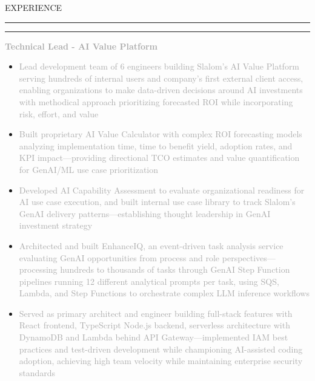 \documentclass[10pt,letterpaper]{article}
\newcommand{\mainheader}[1]{%
    \vspace{6pt}
    {\displayfont\Large\textcolor{accent}{\MakeUppercase{#1}}}
    \vspace{1pt}
    \par\noindent\textcolor{accent}{\rule{5.0in}{2pt}}
    \vspace{3pt}
}
\newcommand{\companyHeader}[2]{%
    \vspace{3pt}
    \noindent\textcolor{#2}{\rule{3pt}{10pt}}\hspace{6pt}{\headingfont\normalsize\textbf{\textcolor{darkgray}{#1}}}
    \vspace{1pt}
}
\newcommand{\positionHeader}[2]{%
    \noindent\textbf{\textcolor{darkgray}{#2}}\hspace{4pt}{\footnotesize\textcolor{mediumgray}{//}}\hspace{4pt}{\footnotesize\itshape\textcolor{mediumgray}{#1}}
    \vspace{1pt}
}
\begin{document}
\begin{minipage}[t][10.5in][t]{5.6in}
\vspace{0.3in}
\hspace{0.3in}
\begin{minipage}{5.0in}
\raggedright

\mainheader{Experience}
\vspace{-8pt}

\companyHeader{Slalom}{company1}

\positionHeader{2023 – Present}{Technical Lead - AI Value Platform}
\begin{itemize}
    \setlength\itemsep{0.25pt}
    \item\small\textcolor{darkgray}{Lead development team of 6 engineers building Slalom's AI Value Platform serving hundreds of internal users and company's first external client access, enabling organizations to make data-driven decisions around AI investments with methodical approach prioritizing forecasted ROI while incorporating risk, effort, and value}
    \item\small\textcolor{darkgray}{Built proprietary AI Value Calculator with complex ROI forecasting models analyzing implementation time, time to benefit yield, adoption rates, and KPI impact—providing directional TCO estimates and value quantification for GenAI/ML use case prioritization}
    \item\small\textcolor{darkgray}{Developed AI Capability Assessment to evaluate organizational readiness for AI use case execution, and built internal use case library to track Slalom's GenAI delivery patterns—establishing thought leadership in GenAI investment strategy}
    \item\small\textcolor{darkgray}{Architected and built EnhanceIQ, an event-driven task analysis service evaluating GenAI opportunities from process and role perspectives—processing hundreds to thousands of tasks through GenAI Step Function pipelines running 12 different analytical prompts per task, using SQS, Lambda, and Step Functions to orchestrate complex LLM inference workflows}
    \item\small\textcolor{darkgray}{Served as primary architect and engineer building full-stack features with React frontend, TypeScript Node.js backend, serverless architecture with DynamoDB and Lambda behind API Gateway—implemented IAM best practices and test-driven development while championing AI-assisted coding adoption, achieving high team velocity while maintaining enterprise security standards}
\end{itemize}


\end{minipage}
\end{minipage}
\end{document}
